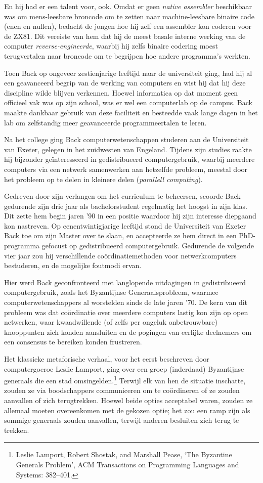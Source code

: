 \documentclass[
  a5paper,
  smalldemyvopaper,11pt,twoside,onecolumn,openright,extrafontsizes]{memoir}
\begin{document}
En hij had er een talent voor, ook. Omdat er geen \emph{native
assembler} beschikbaar was om mens-leesbare broncode om te zetten naar
machine-leesbare binaire code (enen en nullen), bedacht de jongen hoe
hij zelf een assembler kon coderen voor de ZX81. Dit vereiste van hem
dat hij de meest basale interne werking van de computer
\emph{reverse-engineerde}, waarbij hij zelfs binaire codering moest
terugvertalen naar broncode om te begrijpen hoe andere programma's
werkten.

Toen Back op ongeveer zestienjarige leeftijd naar de universiteit ging,
had hij al een geavanceerd begrip van de werking van computers en wist
hij dat hij deze discipline wilde blijven verkennen. Hoewel informatica
op dat moment geen officieel vak was op zijn school, was er wel een
computerlab op de campus. Back maakte dankbaar gebruik van deze
faciliteit en besteedde vaak lange dagen in het lab om zelfstandig meer
geavanceerde programmeertalen te leren.

Na het college ging Back computerwetenschappen studeren aan de
Universiteit van Exeter, gelegen in het zuidwesten van Engeland. Tijdens
zijn studies raakte hij bijzonder geïnteresseerd in gedistribueerd
computergebruik, waarbij meerdere computers via een netwerk samenwerken
aan hetzelfde probleem, meestal door het probleem op te delen in
kleinere delen (\emph{parallell computing}).

Gedreven door zijn verlangen om het curriculum te beheersen, scoorde
Back gedurende zijn drie jaar als bachelorstudent regelmatig het hoogst
in zijn klas. Dit zette hem begin jaren '90 in een positie waardoor hij
zijn interesse diepgaand kon nastreven. Op eenentwintigjarige leeftijd
stond de Universiteit van Exeter Back toe om zijn Master over te slaan,
en accepteerde ze hem direct in een PhD-programma gefocust op
gedistribueerd computergebruik. Gedurende de volgende vier jaar zou hij
verschillende coördinatiemethoden voor netwerkcomputers bestuderen, en
de mogelijke foutmodi ervan.

Hier werd Back geconfronteerd met langlopende uitdagingen in
gedistribueerd computergebruik, zoals het Byzantijnse Generaalsprobleem,
waarmee computerwetenschappers al worstelden sinds de late jaren '70. De
kern van dit probleem was dat coördinatie over meerdere computers lastig
kon zijn op open netwerken, waar kwaadwillende (of zelfs per ongeluk
onbetrouwbare) knooppunten zich konden aansluiten en de pogingen van
eerlijke deelnemers om een consensus te bereiken konden frustreren.

Het klassieke metaforische verhaal, voor het eerst beschreven door
computergoeroe Leslie Lamport, ging over een groep (inderdaad)
Byzantijnse generaals die een stad omsingelden.\footnote{Leslie Lamport,
  Robert Shostak, and Marshall Pease, `The Byzantine Generals Problem',
  ACM Transactions on Programming Languages and Systems: 382--401.}
Terwijl elk van hen de situatie inschatte, zouden ze via boodschappers
communiceren om te coördineren of ze zouden aanvallen of zich
terugtrekken. Hoewel beide opties acceptabel waren, zouden ze allemaal
moeten overeenkomen met de gekozen optie; het zou een ramp zijn als
sommige generaals zouden aanvallen, terwijl anderen besluiten zich terug
te trekken.
\end{document}

